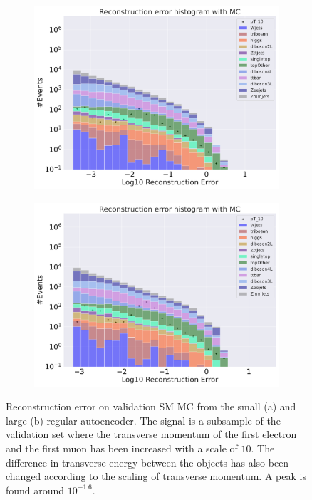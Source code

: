 \begin{figure}[H]
    \centering
    \begin{subfigure}{.45\textwidth}
        \includegraphics[width=\textwidth]{Figures/AE_testing/small/b_data_recon_big_rm3_feats_sig_pT_10.pdf}
        \caption{}
        \label{fig:ae_small_pt_10}
    \end{subfigure}
    \hfill 
    \begin{subfigure}{.45\textwidth}
        \includegraphics[width=\textwidth]{Figures/AE_testing/big/b_data_recon_big_rm3_feats_sig_pT_10.pdf}
        \caption{}
        \label{fig:ae_big_pt_10}
    \end{subfigure}
    \hfill 
    \caption[AE | Reconstruction error $p_T$ altering of 10]{Reconstruction error on validation SM MC from the small (a) and large (b) regular autoencoder. The signal is a subsample of the validation 
    set where the transverse momentum of the first electron and the first muon has been increased with a scale of $10$. The difference in transverse energy between the objects has also been changed according to the scaling of transverse momentum. 
    A peak is found around $10^{-1.6}$.}
    \label{fig:ae_big_small_pt_10}
\end{figure}




